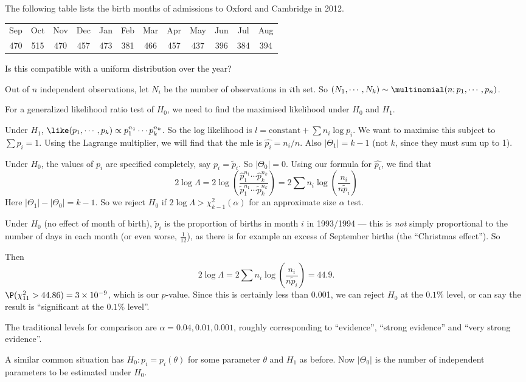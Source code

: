 \documentclass[a4paper]{article}
\begin{document}
\begin{eg}
  The following table lists the birth months of admissions to Oxford and Cambridge in 2012.
  \begin{center}
    \begin{tabular}{cccccccccccc}
      \toprule
      Sep & Oct & Nov & Dec & Jan & Feb & Mar & Apr & May & Jun & Jul & Aug\\
      470 & 515 & 470 & 457 & 473 & 381 & 466 & 457 & 437 & 396 & 384 & 394\\
      \bottomrule
    \end{tabular}
  \end{center}
  Is this compatible with a uniform distribution over the year?

  Out of $n$ independent observations, let $N_i$ be the number of observations in $i$th set. So $(N_1,\cdots, N_k)\sim \multinomial(n; p_1, \cdots, p_n)$.

  For a generalized likelihood ratio test of $H_0$, we need to find the maximised likelihood under $H_0$ and $H_1$.

  Under $H_1$, $\like(p_1, \cdots, p_k) \propto p_1^{n_1}\cdots p_k^{n_k}$. So the log likelihood is $l = \text{constant} + \sum n_i \log p_i$. We want to maximise this subject to $\sum p_i = 1$. Using the Lagrange multiplier, we will find that the mle is $\hat{p_i} = n_i/n$. Also $|\Theta_1| = k - 1$ (not $k$, since they must sum up to 1).

  Under $H_0$, the values of $p_i$ are specified completely, say $p_i = \tilde{p}_i$. So $|\Theta_0| = 0$. Using our formula for $\hat{p_i}$, we find that
  \[
    2\log \Lambda = 2\log\left(\frac{\hat{p}_1^{n_1}\cdots \hat{p}_k^{n_k}}{\tilde{p}_{1}^{n_1}\cdots \tilde{p}_k^{n_k}}\right) = 2\sum n_i \log \left(\frac{n_i}{n\tilde{p}_i}\right)\tag{1}
  \]
  Here $|\Theta_1| - |\Theta_0| = k - 1$. So we reject $H_0$ if $2\log \Lambda > \chi_{k - 1}^2(\alpha)$ for an approximate size $\alpha$ test.

  Under $H_0$ (no effect of month of birth), $\tilde{p}_i$ is the proportion of births in month $i$ in 1993/1994 --- this is \emph{not} simply proportional to the number of days in each month (or even worse, $\frac{1}{12}$), as there is for example an excess of September births (the ``Christmas effect''). So

  Then
  \[
    2\log \Lambda = 2\sum n_i \log\left(\frac{n_i}{n\tilde{p}_i}\right) = 44.9.
  \]
  $\P(\chi_{11}^2 > 44.86) = 3\times 10^{-9}$, which is our $p$-value. Since this is certainly less than 0.001, we can reject $H_0$ at the $0.1\%$ level, or can say the result is ``significant at the $0.1\%$ level''.

  The traditional levels for comparison are $\alpha = 0.04, 0.01, 0.001$, roughly corresponding to ``evidence'', ``strong evidence'' and ``very strong evidence''.
\end{eg}
A similar common situation has $H_0: p_i = p_i(\theta)$ for some parameter $\theta$ and $H_1$ as before. Now $|\Theta_0|$ is the number of independent parameters to be estimated under $H_0$.
\end{document}
